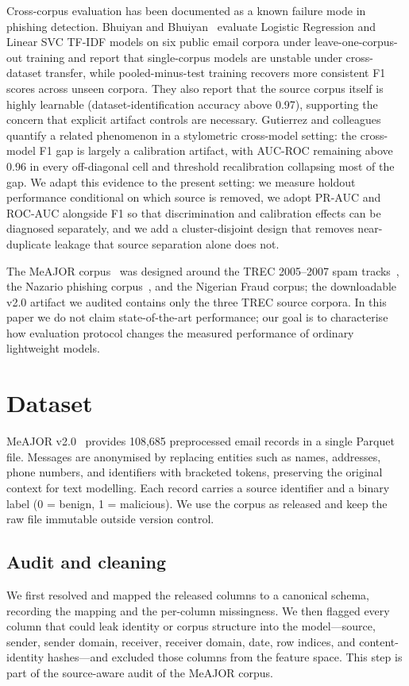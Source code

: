 \documentclass[conference]{IEEEtran}
\begin{document}
Cross-corpus evaluation has been documented as a known failure mode in phishing detection. Bhuiyan and Bhuiyan~\cite{bhuiyan_fragility_2026} evaluate Logistic Regression and Linear SVC TF-IDF models on six public email corpora under leave-one-corpus-out training and report that single-corpus models are unstable under cross-dataset transfer, while pooled-minus-test training recovers more consistent F1 scores across unseen corpora. They also report that the source corpus itself is highly learnable (dataset-identification accuracy above 0.97), supporting the concern that explicit artifact controls are necessary. Gutierrez and colleagues~\cite{gutierrez_crossmodel_2026} quantify a related phenomenon in a stylometric cross-model setting: the cross-model F1 gap is largely a calibration artifact, with AUC-ROC remaining above 0.96 in every off-diagonal cell and threshold recalibration collapsing most of the gap. We adapt this evidence to the present setting: we measure holdout performance conditional on which source is removed, we adopt PR-AUC and ROC-AUC alongside F1 so that discrimination and calibration effects can be diagnosed separately, and we add a cluster-disjoint design that removes near-duplicate leakage that source separation alone does not.

The MeAJOR corpus~\cite{meajor_dataset_paper} was designed around the TREC 2005--2007 spam tracks~\cite{trec_spam_overviews}, the Nazario phishing corpus~\cite{nazario_phishing}, and the Nigerian Fraud corpus; the downloadable v2.0 artifact we audited contains only the three TREC source corpora. In this paper we do not claim state-of-the-art performance; our goal is to characterise how evaluation protocol changes the measured performance of ordinary lightweight models.

\section{Dataset}
MeAJOR v2.0~\cite{meajor_dataset_record} provides 108,685 preprocessed email records in a single Parquet file. Messages are anonymised by replacing entities such as names, addresses, phone numbers, and identifiers with bracketed tokens, preserving the original context for text modelling. Each record carries a source identifier and a binary label (0 = benign, 1 = malicious). We use the corpus as released and keep the raw file immutable outside version control.

\subsection{Audit and cleaning}
We first resolved and mapped the released columns to a canonical schema, recording the mapping and the per-column missingness. We then flagged every column that could leak identity or corpus structure into the model---source, sender, sender domain, receiver, receiver domain, date, row indices, and content-identity hashes---and excluded those columns from the feature space. This step is part of the source-aware audit of the MeAJOR corpus.
\end{document}
